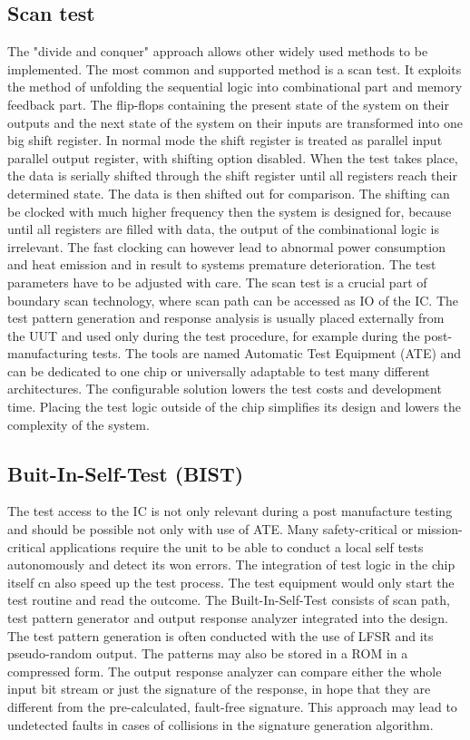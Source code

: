\subsection{Scan test}
The "divide and conquer" approach allows other widely used methods to be implemented. The most common and supported method is a scan test. It exploits the method of unfolding the sequential logic into combinational part and memory feedback part. The flip-flops containing the present state of the system on their outputs and the next state of the system on their inputs are transformed into one big shift register. In normal mode the shift register is treated as parallel input parallel output register, with shifting option disabled. When the test takes place, the data is serially shifted through the shift register until all registers reach their determined state. The data is then shifted out for comparison. The shifting can be clocked with much higher frequency then the system is designed for, because until all registers are filled with data, the output of the combinational logic is irrelevant. The fast clocking can however lead to abnormal power consumption and heat emission and in result to systems premature deterioration. The test parameters have to be adjusted with care. The scan test is a crucial part of boundary scan technology, where scan path can be accessed as IO of the IC. The test pattern generation and response analysis is usually placed externally from the UUT and used only during the test procedure, for example during the post-manufacturing tests. The tools are named Automatic Test Equipment (ATE) and can be dedicated to one chip or universally adaptable to test many different architectures. The configurable solution lowers the test costs and development time. Placing the test logic outside of the chip simplifies its design and lowers the complexity of the system.

\subsection{Buit-In-Self-Test (BIST)}
The test access to the IC is not only relevant during a post manufacture testing and should be possible not only with use of ATE. Many safety-critical or mission-critical applications require the unit to be able to conduct a local self tests autonomously and detect its won errors. The integration of test logic in the chip itself cn also speed up the test process. The test equipment would only start the test routine and read the outcome. The Built-In-Self-Test consists of scan path, test pattern generator and output response analyzer integrated into the design. The test pattern generation is often conducted with the use of LFSR and its pseudo-random output. The patterns may also be stored in a ROM in a compressed form. The output response analyzer can compare either the whole input bit stream or just the signature of the response, in hope that they are different from the pre-calculated, fault-free signature. This approach may lead to undetected faults in cases of collisions in the signature generation algorithm.

